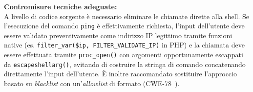 \documentclass[11pt]{report}
\begin{document}
\begin{tcolorbox}[colback=gray!5, colframe=headerblue, arc=3pt, boxrule=0.8pt, breakable]
		\textbf{Contromisure tecniche adeguate:}\\
		A livello di codice sorgente è necessario eliminare le chiamate dirette alla shell. Se l'esecuzione del comando \texttt{ping} è effettivamente richiesta, l'input dell'utente deve essere validato preventivamente come indirizzo IP legittimo tramite funzioni native (es. \texttt{filter\_var(\$ip, FILTER\_VALIDATE\_IP)} in PHP) e la chiamata deve essere effettuata tramite \texttt{proc\_open()} con argomenti opportunamente escappati da \texttt{escapeshellarg()}, evitando di costruire la stringa di comando concatenando direttamente l'input dell'utente. È inoltre raccomandato sostituire l'approccio basato su \textit{blacklist} con un'\textit{allowlist} di formato (CWE-78~\cite{cwe78}).
	\end{tcolorbox}
	
\end{document}
